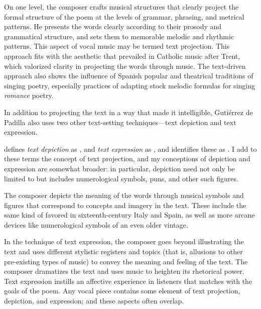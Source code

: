 On one level, the composer crafts musical structures that clearly project the
formal structure of the poem at the levels of grammar, phrasing, and metrical
patterns.
He presents the words clearly according to their prosody and grammatical
structure, and sets them to memorable melodic and rhythmic patterns.
This aspect of vocal music may be termed text projection.
This approach fits with the aesthetic that prevailed in Catholic music after
Trent, which valorized clarity in projecting the words through music.
The text-driven approach also shows the influence of Spanish popular and
theatrical traditions of singing poetry, especially practices of adapting stock
melodic formulas for singing \emph{romance} poetry.

In addition to projecting the text in a way that made it intelligible, Gutiérrez
de Padilla also uses two other text-setting techniques---text depiction and text
expression.%
\begin{Footnote}
    \Autocite[207]{Burkholder:History} defines \emph{text depiction} as
    , and
    \emph{text expression} as , and identifies these as .
    I add to these terms the concept of text projection, and my conceptions of
    depiction and expression are somewhat broader: in particular, depiction need
    not only be limited to  but includes numerological
    symbols, puns, and other such figures.
\end{Footnote}
The composer depicts the meaning of the words through musical symbols and
figures that correspond to concepts and imagery in the text.
These include the same kind of  favored in
sixteenth-century Italy and Spain, as well as more arcane devices like
numerological symbols of an even older vintage.

In the technique of text expression, the composer goes beyond illustrating the
text and uses different stylistic registers and topics (that is, allusions to
other pre-existing types of music) to convey the meaning and feeling of the
text.
The composer dramatizes the text and uses music to heighten its rhetorical
power.
Text expression instills an affective experience in listeners that matches with
the goals of the poem.
Any vocal piece contains some element of text projection, depiction, and
expression; and these aspects often overlap.

